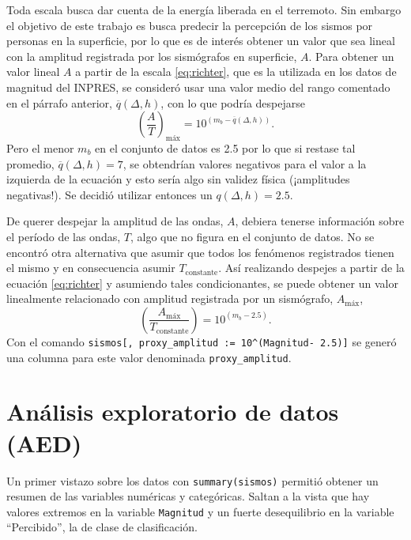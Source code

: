 \documentclass[a4paper]{report}
\begin{document}
Toda escala busca dar cuenta de la energía liberada en el terremoto.
Sin embargo el objetivo de este trabajo es busca predecir la percepción de los sismos por personas en la superficie, por lo que es de interés obtener un valor que sea lineal con la amplitud registrada por los sismógrafos en superficie, \(A\).
Para obtener un valor lineal \(A\) a partir de la escala \ref{eq:richter}, que es la utilizada en los datos de magnitud del INPRES, se consideró usar una valor medio del rango comentado en el párrafo anterior, \(\overline{q}(\Delta,h)\), con lo que podría despejarse
\begin{equation}
	\left( \frac{A}{T} \right)_\text{máx} = 10^{(m_b - \overline{q}(\Delta,h) )}.
	\label{eq:linealizacionMagnitud}
\end{equation}
Pero el menor \(m_b\) en el conjunto de datos es \num{2.5} por lo que si restase tal promedio, \(\overline{q}(\Delta,h) = 7\), se obtendrían valores negativos para el valor a la izquierda de la ecuación y esto sería algo sin validez física (¡amplitudes negativas!).
Se decidió utilizar entonces un \(q(\Delta,h) = \num{2.5}\).  

De querer despejar la amplitud de las ondas, \(A\), debiera tenerse información sobre el período de las ondas, \(T\), algo que no figura en el conjunto de datos.
No se encontró otra alternativa que asumir que todos los fenómenos registrados tienen el mismo y en consecuencia asumir \(T_\text{constante}\).
Así realizando despejes a partir de la ecuación \ref{eq:richter} y asumiendo tales condicionantes, se puede obtener un valor linealmente relacionado con amplitud registrada por un sismógrafo, \(A_\text{máx}\),
\begin{equation}
	\left( \frac{A_\text{máx}}{T_\text{constante}} \right) = 10^{(m_b - 2.5)}.
	\label{eq:linealizacionMagnitud_final} 
\end{equation}
Con el comando \verb'sismos[, proxy_amplitud := 10^(Magnitud- 2.5)]' se generó una columna para este valor denominada \verb'proxy_amplitud'.



\section{Análisis exploratorio de datos (AED)}\label{sec:AED}

Un primer vistazo sobre los datos con \verb'summary(sismos)' permitió obtener un resumen de las variables numéricas y categóricas.
Saltan a la vista que hay valores extremos en la variable \verb'Magnitud' y un fuerte desequilibrio en la variable ``Percibido'', la de clase de clasificación.
\end{document}
